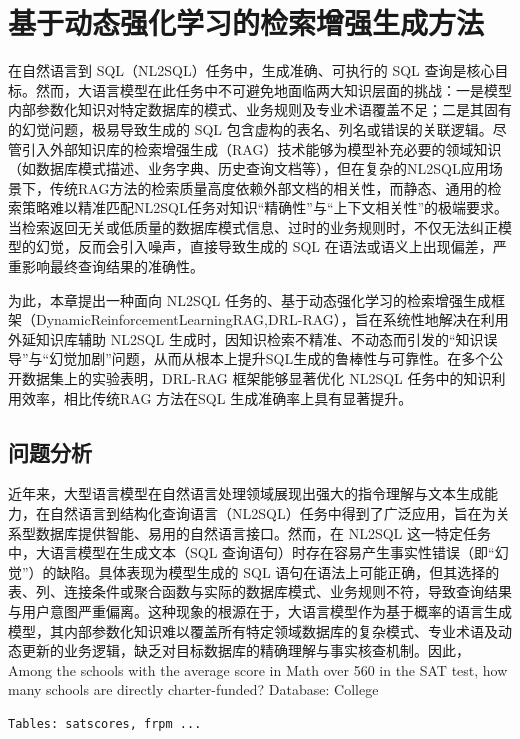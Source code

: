 \documentclass[12pt,a4paper,openright,UTF8]{ctexbook}
\begin{document}
\chapter{基于动态强化学习的检索增强生成方法}

在自然语言到 SQL（NL2SQL）任务中，生成准确、可执行的 SQL 查询是核心目标。然而，大语言模型在此任务中不可避免地面临两大知识层面的挑战：一是模型内部参数化知识对特定数据库的模式、业务规则及专业术语覆盖不足；二是其固有的幻觉问题，极易导致生成的 SQL 包含虚构的表名、列名或错误的关联逻辑。尽管引入外部知识库的检索增强生成（RAG）技术能够为模型补充必要的领域知识（如数据库模式描述、业务字典、历史查询文档等），但在复杂的NL2SQL应用场景下，传统RAG方法的检索质量高度依赖外部文档的相关性，而静态、通用的检索策略难以精准匹配NL2SQL任务对知识“精确性”与“上下文相关性”的极端要求。当检索返回无关或低质量的数据库模式信息、过时的业务规则时，不仅无法纠正模型的幻觉，反而会引入噪声，直接导致生成的 SQL 在语法或语义上出现偏差，严重影响最终查询结果的准确性。


为此，本章提出一种面向 NL2SQL 任务的、基于动态强化学习的检索增强生成框架（DynamicReinforcementLearningRAG,DRL-RAG），旨在系统性地解决在利用外延知识库辅助 NL2SQL 生成时，因知识检索不精准、不动态而引发的“知识误导”与“幻觉加剧”问题，从而从根本上提升SQL生成的鲁棒性与可靠性。在多个公开数据集上的实验表明，DRL-RAG 框架能够显著优化 NL2SQL 任务中的知识利用效率，相比传统RAG 方法在SQL 生成准确率上具有显著提升。

\section{问题分析}

近年来，大型语言模型在自然语言处理领域展现出强大的指令理解与文本生成能力，在自然语言到结构化查询语言（NL2SQL）任务中得到了广泛应用，旨在为关系型数据库提供智能、易用的自然语言接口。然而，在 NL2SQL 这一特定任务中，大语言模型在生成文本（SQL 查询语句）时存在容易产生事实性错误（即“幻觉”）的缺陷。具体表现为模型生成的 SQL 语句在语法上可能正确，但其选择的表、列、连接条件或聚合函数与实际的数据库模式、业务规则不符，导致查询结果与用户意图严重偏离。这种现象的根源在于，大语言模型作为基于概率的语言生成模型，其内部参数化知识难以覆盖所有特定领域数据库的复杂模式、专业术语及动态更新的业务逻辑，缺乏对目标数据库的精确理解与事实核查机制。因此，Among the schools with the average score in Math over 560 in the SAT test, how many schools are directly charter-funded? Database: College

\begin{lstlisting}
Tables: satscores, frpm ...
\end{lstlisting}
\end{document}

